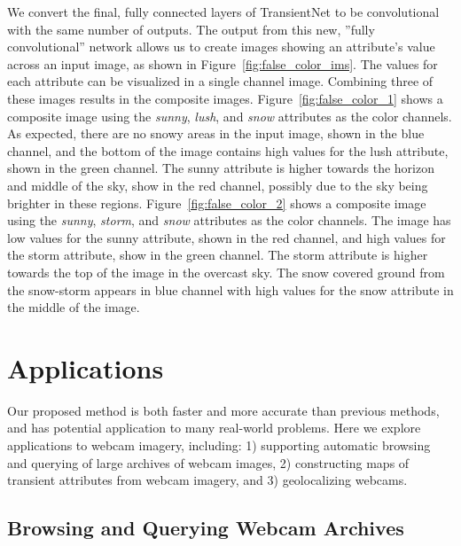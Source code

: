 \documentclass[10pt,twocolumn,letterpaper]{article}
\newcommand{\figref}[1]{Figure~\ref{fig:#1}}
\begin{document}
We convert the final, fully connected layers of TransientNet to be
convolutional~\cite{long2015fully} with the same number of outputs.  The output
from this new, ''fully convolutional'' network allows us to create images
showing an attribute's value across an input image, as shown in
\figref{false_color_ims}.  The values for each attribute can be visualized in a
single channel image.  Combining three of these images results in the composite
images.  \figref{false_color_1} shows a composite image using the
\textit{sunny}, \textit{lush}, and \textit{snow} attributes as the color
channels.  As expected, there are no snowy areas in the input image, shown in
the blue channel, and the bottom of the image contains high values for the lush
attribute, shown in the green channel.  The sunny attribute is higher towards
the horizon and middle of the sky, show in the red channel, possibly due to the
sky being brighter in these regions.  \figref{false_color_2} shows a composite
image using the \textit{sunny}, \textit{storm}, and \textit{snow} attributes as
the color channels.  The image has low values for the sunny attribute, shown in
the red channel, and high values for the storm attribute, show in the green
channel.  The storm attribute is higher towards the top of the image in the
overcast sky.  The snow covered ground from the snow-storm appears in blue
channel with high values for the snow attribute in the middle of the image.

\section{Applications}

Our proposed method is both faster and more accurate than previous methods, and
has potential application to many real-world problems.  Here we explore
applications to webcam imagery, including: 1) supporting automatic browsing and
querying of large archives of webcam images, 2) constructing maps of transient
attributes from webcam imagery, and 3) geolocalizing webcams.

\subsection{Browsing and Querying Webcam Archives}
\end{document}
